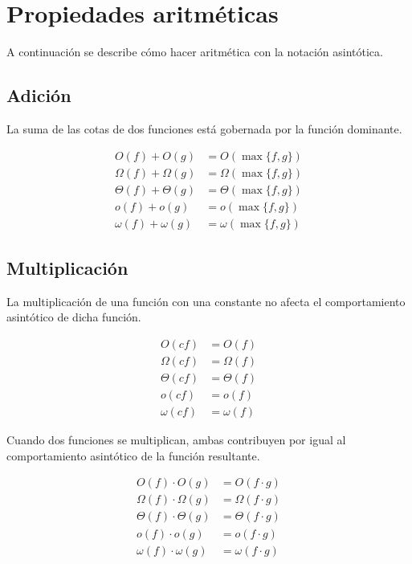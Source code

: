 \section{Propiedades aritméticas}

A continuación se describe cómo hacer aritmética con la notación asintótica.

\subsection{Adición}

La suma de las cotas de dos funciones está gobernada por la función
dominante.

\[
\begin{aligned}
    O(f)+O(g) &= O(\max\{f,g\})\\
    \Omega(f)+\Omega(g) &= \Omega(\max\{f,g\})\\
    \Theta(f)+\Theta(g) &= \Theta(\max\{f,g\})\\
    o(f)+o(g) &= o(\max\{f,g\})\\
    \omega(f)+\omega(g) &= \omega(\max\{f,g\})
\end{aligned}
\]

\subsection{Multiplicación}

La multiplicación de una función con una constante no afecta el comportamiento
asintótico de dicha función.

\[
\begin{aligned}
    O(c f) &= O(f)\\
    \Omega(c f) &= \Omega(f)\\
    \Theta(c f) &= \Theta(f)\\
    o(c f) &= o(f)\\
    \omega(c f) &= \omega(f)
\end{aligned}
\]

Cuando dos funciones se multiplican, ambas contribuyen por igual al
comportamiento asintótico de la función resultante.

\[
\begin{aligned}
    O(f)\cdot O(g) &= O(f\cdot g)\\
    \Omega(f)\cdot\Omega(g) &= \Omega(f\cdot g)\\
    \Theta(f)\cdot\Theta(g) &= \Theta(f\cdot g)\\
    o(f)\cdot o(g) &= o(f\cdot g)\\
    \omega(f)\cdot\omega(g) &= \omega(f\cdot g)
\end{aligned}
\]


